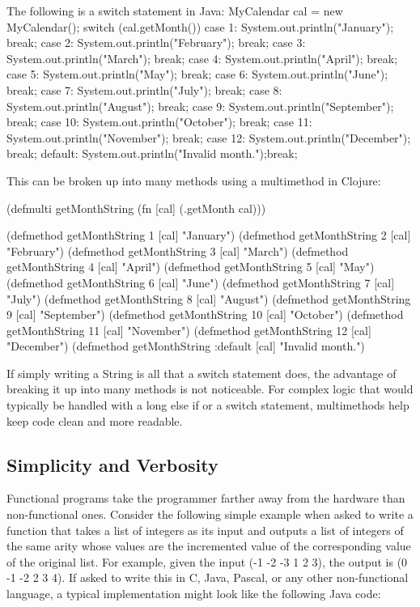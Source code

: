 The following is a switch statement in Java:
MyCalendar cal = new MyCalendar();
switch (cal.getMonth()) {
            case 1:  System.out.println("January"); break;
            case 2:  System.out.println("February"); break;
            case 3:  System.out.println("March"); break;
            case 4:  System.out.println("April"); break;
            case 5:  System.out.println("May"); break;
            case 6:  System.out.println("June"); break;
            case 7:  System.out.println("July"); break;
            case 8:  System.out.println("August"); break;
            case 9:  System.out.println("September"); break;
            case 10: System.out.println("October"); break;
            case 11: System.out.println("November"); break;
            case 12: System.out.println("December"); break;
            default: System.out.println("Invalid month.");break;
        }

This can be broken up into many methods using a multimethod in Clojure:

(defmulti getMonthString (fn [cal] (.getMonth cal)))

(defmethod getMonthString 1 [cal] "January")
(defmethod getMonthString 2 [cal] "February")
(defmethod getMonthString 3 [cal] "March")
(defmethod getMonthString 4 [cal] "April")
(defmethod getMonthString 5 [cal] "May")
(defmethod getMonthString 6 [cal] "June")
(defmethod getMonthString 7 [cal] "July")
(defmethod getMonthString 8 [cal] "August")
(defmethod getMonthString 9 [cal] "September")
(defmethod getMonthString 10 [cal] "October")
(defmethod getMonthString 11 [cal] "November")
(defmethod getMonthString 12 [cal] "December")
(defmethod getMonthString :default [cal] "Invalid month.")

If simply writing a String is all that a switch statement does, the advantage of breaking it up into many
methods is not noticeable. For complex logic that would typically be handled with a long else if or a switch statement, 
multimethods help keep code clean and more readable.

\subsection{Simplicity and Verbosity}
Functional programs take the programmer farther away from the hardware
than non-functional ones. 
Consider the following simple example when asked to write a function
that takes a list of integers as its input and outputs a list of
integers of the same arity whose values are the incremented value of
the corresponding value of the original list. 
For example, given the input (-1 -2 -3 1 2 3), the output is (0 -1
-2 2 3 4). 
If asked to write this in C, Java, Pascal, or any other non-functional language, a typical implementation might look like the following Java code: 

